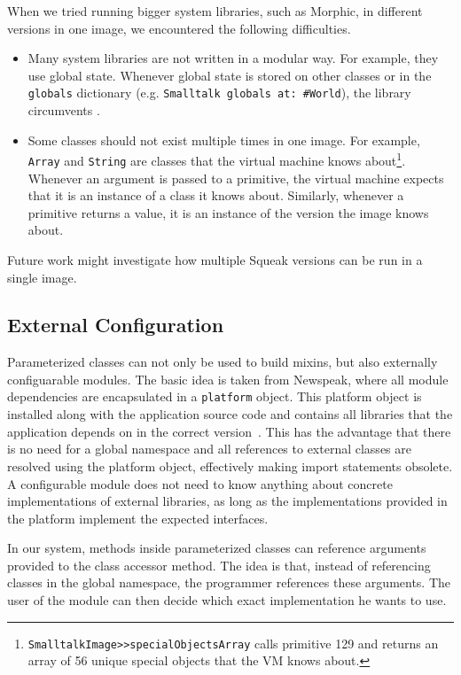 When we tried running bigger system libraries, such as Morphic, in different versions in one image, we encountered the following difficulties.
\begin{itemize}
    \item Many system libraries are not written in a modular way. For example, they use global state. Whenever global state is stored on other classes or in the \texttt{globals} dictionary (e.g. \texttt{Smalltalk globals at: \textcolor{RoyalPurple}{\#World}}), the library circumvents \msname.
    \item Some classes should not exist multiple times in one image. For example, \texttt{Array} and \texttt{String} are classes that the virtual machine knows about\footnote{\texttt{SmalltalkImage>>specialObjectsArray} calls primitive 129 and returns an array of 56 unique special objects that the VM knows about.}. Whenever an argument is passed to a primitive, the virtual machine expects that it is an instance of a class it knows about. Similarly, whenever a primitive returns a value, it is an instance of the version the image knows about.
\end{itemize}

Future work might investigate how multiple Squeak versions can be run in a single image.

\subsection{External Configuration}
Parameterized classes can not only be used to build mixins, but also externally configuarable modules. The basic idea is taken from Newspeak, where all module dependencies are encapsulated in a \texttt{platform} object. This platform object is installed along with the application source code and contains all libraries that the application depends on in the correct version~\cite{bracha2008newspeak}. This has the advantage that there is no need for a global namespace and all references to external classes are resolved using the platform object, effectively making import statements obsolete. A configurable module does not need to know anything about concrete implementations of external libraries, as long as the implementations provided in the platform implement the expected interfaces.

In our system, methods inside parameterized classes can reference arguments provided to the class accessor method. The idea is that, instead of referencing classes in the global namespace, the programmer references these arguments. The user of the module can then decide which exact implementation he wants to use.

